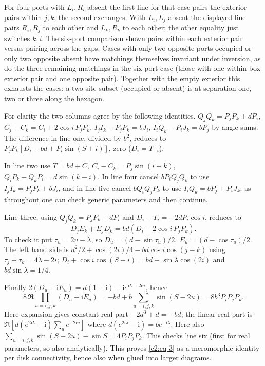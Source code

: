 For four ports with \(L_i,R_i\) absent the first line for that case pairs the exterior pairs within \(j,k\), the second exchanges. With \(L_i,L_j\) absent the displayed line pairs \(R_i,R_j\) to each other and \(L_k,R_k\) to each other; the other equality just switches \(k,i\). The six-port comparison shown pairs within each exterior pair versus pairing across the gaps. Cases with only two opposite ports occupied or only two opposite absent have matchings themselves invariant under inversion, as do the three remaining matchings in the six-port case (those with one within-box exterior pair and one opposite pair). Together with the empty exterior this exhausts the cases: a two-site subset (occupied or absent) is at separation one, two or three along the hexagon.

For clarity the two columns agree by the following identities. \(Q_jQ_k=P_jP_k+dP_i\), \(C_j+C_k=C_i+2\cos i\,P_jP_k\), \(I_j I_k-P_jP_k=b J_i\), \(I_i Q_k-P_i J_k=b P_j\) by angle sums. The difference in line one, divided by \(b^2\), reduces to \(P_jP_k[D_i-bd+P_i\sin(S+i)]\), zero (\(D_i=T_{-i}\)). 

In line two use \(T=bd+C,\ C_i-C_k=P_j\sin(i-k)\), \(Q_iP_k-Q_kP_i=d\sin(k-i)\). In line four cancel \(bP_i Q_jQ_k\) to use \(I_jI_k=P_jP_k+bJ_i\), and in line five cancel \(b Q_i Q_j P_k\) to use \(I_iQ_k=bP_j+P_iJ_k\); as throughout one can check generic parameters and then continue. 

Line three, using \(Q_jQ_k=P_jP_k+dP_i\) and \(D_i-T_i=-2dP_i\cos i\), reduces to
\[
 D_j E_k+E_jD_k=bd(D_i-2\cos i\,P_jP_k).
\]
To check it put \(\tau_u=2u-\lambda\), so \(D_u=(d-\sin\tau_u)/2,\ E_u=(d-\cos\tau_u)/2\). The left hand side is \(d^2/2+\cos(2i)/4-bd\cos i\cos(j-k)\) using \(\tau_j+\tau_k=4\lambda-2i\); \(D_i+\cos i\cos(S-i)=bd+\sin\lambda\cos(2i)\) and \(bd\sin\lambda=1/4\). 

Finally \(2(D_u+\mathrm i E_u)=d(1+\mathrm i)-\mathrm i e^{\mathrm i\lambda-2\mathrm i u}\), hence
\[
 8\,\Re\prod_{u=i,j,k}(D_u+\mathrm i E_u)
 =-bd+b\sum_{u=i,j,k}\sin(S-2u)=8b^3 P_iP_jP_k .
\]
Here expansion gives constant real part \(-2d^3+d=-bd\); the linear real part is \(\Re[d(e^{2\mathrm i\lambda}-\mathrm i)\sum_u e^{-2\mathrm i u}]\) where \(d(e^{2\mathrm i\lambda}-\mathrm i)=b e^{-\mathrm i\lambda}\). Here also \(\sum_{u=i,j,k}\sin(S-2u)-\sin S=4P_iP_jP_k\). This checks line six (first for real parameters, so also analytically). This proves \eqref{c2:eq-3} as a meromorphic identity per disk connectivity, hence also when glued into larger diagrams.

